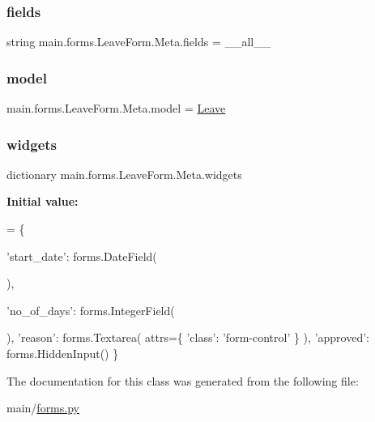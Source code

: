 \mbox{\label{classmain_1_1forms_1_1LeaveForm_1_1Meta_a91d9ecd0c97506cb55f5cab95d92f265}} 
\subsubsection{\texorpdfstring{fields}{fields}}
{\footnotesize\ttfamily string main.\+forms.\+Leave\+Form.\+Meta.\+fields = \textquotesingle{}\+\_\+\+\_\+all\+\_\+\+\_\+\textquotesingle{}\hspace{0.3cm}{\ttfamily [static]}}

\mbox{\label{classmain_1_1forms_1_1LeaveForm_1_1Meta_aca5a4d8bdfe411a83e2742e932c22f88}} 
\subsubsection{\texorpdfstring{model}{model}}
{\footnotesize\ttfamily main.\+forms.\+Leave\+Form.\+Meta.\+model = \hyperlink{classmain_1_1models_1_1Leave}{Leave}\hspace{0.3cm}{\ttfamily [static]}}

\mbox{\label{classmain_1_1forms_1_1LeaveForm_1_1Meta_a04fc19ef83ade3b8d4e1f9d13cac5dcf}} 
\subsubsection{\texorpdfstring{widgets}{widgets}}
{\footnotesize\ttfamily dictionary main.\+forms.\+Leave\+Form.\+Meta.\+widgets\hspace{0.3cm}{\ttfamily [static]}}

{\bfseries Initial value\+:}
\begin{DoxyCode}
=  \{

            \textcolor{stringliteral}{'start\_date'}: forms.DateField(
                
                ),

            \textcolor{stringliteral}{'no\_of\_days'}: forms.IntegerField(
                
                ),
            \textcolor{stringliteral}{'reason'}: forms.Textarea(
                attrs=\{
                    \textcolor{stringliteral}{'class'}: \textcolor{stringliteral}{'form-control'}
                    \}
                ),
            \textcolor{stringliteral}{'approved'}: forms.HiddenInput()
            \}
\end{DoxyCode}


The documentation for this class was generated from the following file\+:\begin{DoxyCompactItemize}
\item 
main/\hyperlink{forms_8py}{forms.\+py}\end{DoxyCompactItemize}

